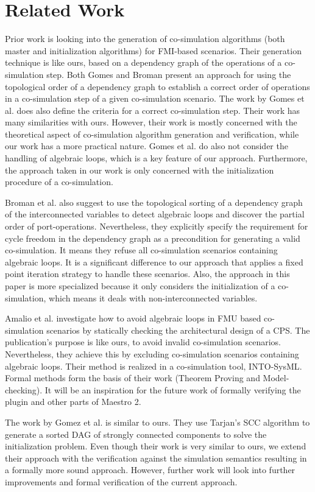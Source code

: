 \section{Related Work}
Prior work \cite{Gomes2019, BromanCompositionCo-Simulation} is looking into the generation of co-simulation algorithms (both master and initialization algorithms) for FMI-based scenarios. Their generation technique is like ours, based on a dependency graph of the operations of a co-simulation step. Both Gomes and Broman present an approach for using the topological order of a dependency graph to establish a correct order of operations in a co-simulation step of a given co-simulation scenario.
The work by Gomes et al. \cite{Gomes2019} does also define the criteria for a correct co-simulation step. Their work has many similarities with ours. However, their work is mostly concerned with the theoretical aspect of co-simulation algorithm generation and verification, while our work has a more practical nature. Gomes et al. do also not consider the handling of algebraic loops, which is a key feature of our approach. Furthermore, the approach taken in our work is only concerned with the initialization procedure of a co-simulation.

Broman et al. \cite{BromanCompositionCo-Simulation} also suggest to use the topological sorting of a dependency graph of the interconnected variables to detect algebraic loops and discover the partial order of port-operations. Nevertheless, they explicitly specify the requirement for cycle freedom in the dependency graph as a precondition for generating a valid co-simulation. It means they refuse all co-simulation scenarios containing algebraic loops. It is a significant difference to our approach that applies a fixed point iteration strategy to handle these scenarios. Also, the approach in this paper is more specialized because it only considers the initialization of a co-simulation, which means it deals with non-interconnected variables.

Amalio et al. \cite{Amalio2016CheckingCo-simulation} investigate how to avoid algebraic loops in FMU based co-simulation scenarios by statically checking the architectural design of a CPS. The publication's purpose is like ours, to avoid invalid co-simulation scenarios. Nevertheless, they achieve this by excluding co-simulation scenarios containing algebraic loops. Their method is realized in a co-simulation tool, INTO-SysML\cite{Miyazawa2016INtegratedModelling}. Formal methods form the basis of their work (Theorem Proving and Model-checking). It will be an inspiration for the future work of formally verifying the plugin and other parts of Maestro 2. 

The work by Gomez et al.\cite{EvoraGomez2019a} is similar to ours. They use Tarjan's SCC algorithm to generate a sorted DAG of strongly connected components to solve the initialization problem.
Even though their work is very similar to ours, we extend their approach with the verification against the simulation semantics resulting in a formally more sound approach. However, further work will look into further improvements and formal verification of the current approach.